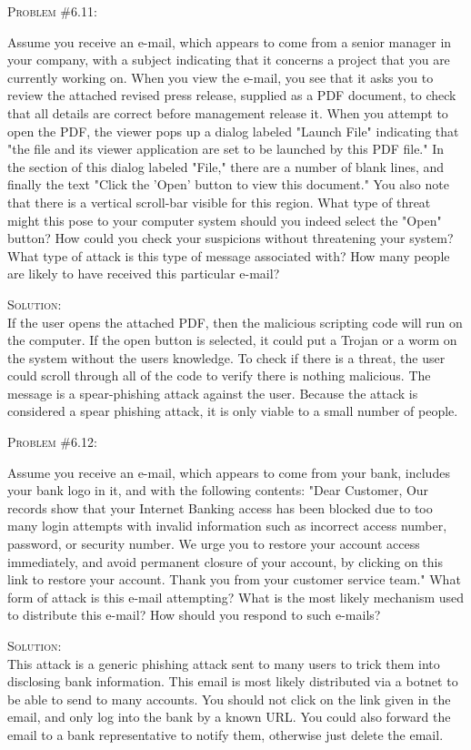 \documentclass[12pt]{article}
\newenvironment{problem}[1]
{\begin{mdframed}[linewidth=0.8pt]
        \textsc{Problem #1:}

}
    {\end{mdframed}}
\newenvironment{solution}
    {\textsc{Solution:}\\}
    {\newpage}%
\begin{document}
	\begin{problem}{\#6.11}
		Assume you receive an e-mail, which appears to come from a senior manager in your company, with a subject indicating that it concerns a project that you are currently working on. When you view the e-mail, you see that it asks you to review the attached revised press release, supplied as a PDF document, to check that all details are correct before management release it. When you attempt to open the PDF, the viewer pops up a dialog labeled "Launch File" indicating that "the file and its viewer application are set to be launched by this PDF file." In the section of this dialog labeled "File," there are a number of blank lines, and finally the text "Click the 'Open' button to view this document." You also note that there is a vertical scroll-bar visible for this region. What type of threat might this pose to your computer system should you indeed select the "Open" button? How could you check your suspicions without threatening your system? What type of attack is this type of message associated with? How many people are likely to have received this particular e-mail?
	\end{problem}
	\begin{solution}
		If the user opens the attached PDF, then the malicious scripting code will run on the computer. If the open button is selected, it could put a Trojan or a worm on the system without the users knowledge. To check if there is a threat, the user could scroll through all of the code to verify there is nothing malicious. The message is a spear-phishing attack against the user. Because the attack is considered a spear phishing attack, it is only viable to a small number of people.
	\end{solution}

	\begin{problem}{\#6.12}
		Assume you receive an e-mail, which appears to come from your bank, includes your bank logo in it, and with the following contents: "Dear Customer, Our records show that your Internet Banking access has been blocked due to too many login attempts with invalid information such as incorrect access number, password, or security number. We urge you to restore your account access immediately, and avoid permanent closure of your account, by clicking on this link to restore your account. Thank you from your customer service team." What form of attack is this e-mail attempting? What is the most likely mechanism used to distribute this e-mail? How should you respond to such e-mails? 
	\end{problem}
	\begin{solution}
		This attack is a generic phishing attack sent to many users to trick them into disclosing bank information. This email is most likely distributed via a botnet to be able to send to many accounts. You should not click on the link given in the email, and only log into the bank by a known URL. You could also forward the email to a bank representative to notify them, otherwise just delete the email.
	\end{solution}
\end{document}
